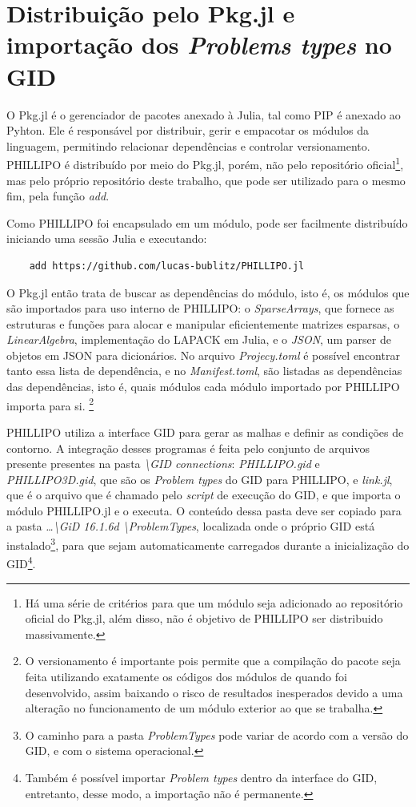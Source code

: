 \section{Distribuição pelo Pkg.jl e importação dos \emph{Problems types} no GID}

O Pkg.jl é o gerenciador de pacotes anexado à Julia, tal como PIP é anexado ao Pyhton. Ele é responsável por distribuir, gerir e empacotar os módulos da linguagem, permitindo relacionar dependências e controlar versionamento. PHILLIPO é distribuído por meio do Pkg.jl, porém, não pelo repositório oficial\footnote{Há uma série de critérios para que um módulo seja adicionado ao repositório oficial do Pkg.jl, além disso, não é objetivo de PHILLIPO ser distribuido massivamente.}, mas pelo próprio repositório deste trabalho, que pode ser utilizado para o mesmo fim, pela função \emph{add}.

Como PHILLIPO foi encapsulado em um módulo, pode ser facilmente distribuído iniciando uma sessão Julia e executando:
\begin{lstlisting}
    add https://github.com/lucas-bublitz/PHILLIPO.jl
\end{lstlisting}

O Pkg.jl então trata de buscar as dependências do módulo, isto é, os módulos que são importados para uso interno de PHILLIPO: o \emph{SparseArrays}, que fornece as estruturas e funções para alocar e manipular eficientemente matrizes esparsas, o \emph{LinearAlgebra}, implementação do LAPACK em Julia, e o \emph{JSON}, um parser de objetos em JSON para dicionários. No arquivo \emph{Projecy.toml} é possível encontrar tanto essa lista de dependência, e no \emph{Manifest.toml}, são listadas as dependências das dependências, isto é, quais módulos cada módulo importado por PHILLIPO importa para si. \footnote{O versionamento é importante pois permite que a compilação do pacote seja feita utilizando exatamente os códigos dos módulos de quando foi desenvolvido, assim baixando o risco de resultados inesperados devido a uma alteração no funcionamento de um módulo exterior ao que se trabalha. }

PHILLIPO utiliza a interface GID para gerar as malhas e definir as condições de contorno. A integração desses programas é feita pelo conjunto de arquivos presente presentes na pasta \emph{\textbackslash GID connections}: \emph{PHILLIPO.gid} e \emph{PHILLIPO3D.gid}, que são os \emph{Problem types} do GID para PHILLIPO, e \emph{link.jl}, que é o arquivo que é chamado pelo \emph{script} de execução do GID, e que importa o módulo PHILLIPO.jl e o executa. O conteúdo dessa pasta deve ser copiado para a pasta \emph{\dots\textbackslash GiD 16.1.6d \textbackslash ProblemTypes}, localizada onde o próprio GID está instalado\footnote{O caminho para a pasta \emph{ProblemTypes} pode variar de acordo com a versão do GID, e com o sistema operacional.}, para que sejam automaticamente carregados durante a inicialização do GID\footnote{Também é possível importar \emph{Problem types} dentro da interface do GID, entretanto, desse modo, a importação não é permanente.}.


